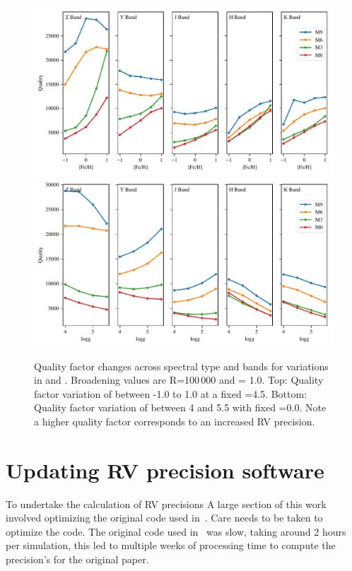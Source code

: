 \begin{figure}
\includegraphics[width=0.99\linewidth]{figures/information-content/metalicity_effect.pdf}\\
\includegraphics[width=0.99\linewidth]{figures/information-content/logg_effect.pdf}
\caption[Quality factor verse \feh{} and \logg{} for different spectral types and wavelength bands.]{Quality factor changes across spectral type and bands for variations in \feh{} and \logg{}.
Broadening values are R=100\,000 and \Vsini{} = 1.0\kmps{}.
Top: Quality factor variation of \feh{} between -1.0 to 1.0 at a fixed \logg{}=4.5.
Bottom: Quality factor variation of \logg{} between 4 and 5.5 with fixed \feh{}=0.0.
Note a higher quality factor corresponds to an increased {RV} precision.}
\label{fig:deviations}
\end{figure}


\clearpage

\section{Updating {RV} precision software}
To undertake the calculation of {RV} precisions
A large section of this work involved optimizing the original code used in~\citet{figueira_radial_2016}.
Care needs to be taken to optimize the code.
The original code used in~\citet{figueira_radial_2016} was slow, taking around 2 hours per simulation, this led to multiple weeks of processing time to compute the precision's for the original paper.

